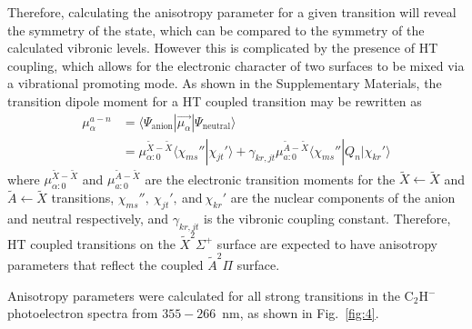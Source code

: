 \documentclass[journal=jpcafh,manuscript=article,layout=onecolumn, 12pt]{achemso}
\begin{document}
Therefore, calculating the anisotropy parameter for a given transition will reveal the symmetry of the state, which can be compared to the symmetry of the calculated vibronic levels. However this is complicated by the presence of HT coupling, which allows for the electronic character of two surfaces to be mixed via a vibrational promoting mode. As shown in the Supplementary Materials, the transition dipole moment for a HT coupled transition may be rewritten as
\begin{align}
\mu_{\alpha}^{a-n} &= \langle \Psi_{\text{anion}}|\vec{\mu_{\alpha}}|\Psi_{\text{neutral}}\rangle\\
&= \mu_{\alpha:0}^{\tilde{X}-\tilde{X}}\langle\chi_{ms}''|\chi_{jt}'\rangle+\gamma_{kr,jt}\mu_{a:0}^{\tilde{A}-\tilde{X}}\langle\chi_{ms}''|Q_n|\chi_{kr}'\rangle
\label{eq:1}
\end{align}  
where $\mu_{\alpha:0}^{\tilde{X}-\tilde{X}}$ and $\mu_{a:0}^{\tilde{A}-\tilde{X}}$ are the electronic transition moments for the $\tilde{X}\leftarrow\tilde{X}$ and $\tilde{A}\leftarrow\tilde{X}$ transitions, $\chi_{ms}'',~\chi_{jt}',~$and$~\chi_{kr}'$ are the nuclear components of the anion and neutral respectively, and $\gamma_{kr,jt}$ is the vibronic coupling constant. Therefore, HT coupled transitions on the $\tilde{X}^2\Sigma^+$ surface are expected to have anisotropy parameters that reflect the coupled $\tilde{A}^2\Pi$ surface.


Anisotropy parameters were calculated for all strong transitions in the C$_2$H$^-$ photoelectron spectra from $355-266$~nm, as shown in Fig.~\ref{fig:4}. 
\end{document}
